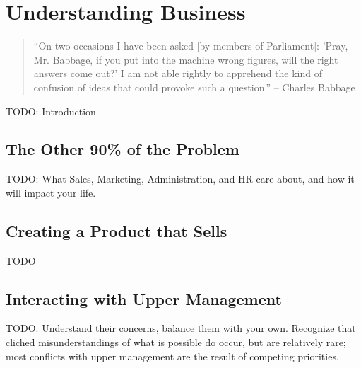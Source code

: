 %
%


\chapter{Understanding Business}

\begin{quote}
``On two occasions I have been asked [by members of Parliament]: 'Pray, Mr. Babbage, if you put into the machine wrong figures, will the right answers come out?' I am not able rightly to apprehend the kind of confusion of ideas that could provoke such a question.'' -- Charles Babbage
\end{quote}


TODO: Introduction


\section{The Other 90\% of the Problem}

TODO: What Sales, Marketing, Administration, and HR care about, and how it will impact your life.


\section{Creating a Product that Sells}

TODO


\section{Interacting with Upper Management}

TODO: Understand their concerns, balance them with your own. Recognize that cliched misunderstandings of what is possible do occur, but are relatively rare; most conflicts with upper management are the result of competing priorities.


\newpage
\thispagestyle{empty}
